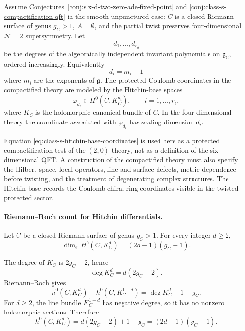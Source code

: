 Assume Conjectures~\ref{conj:six-d-two-zero-ade-fixed-point} and
\ref{conj:class-s-compactification-qft} in the smooth unpunctured case:
\(C\) is a closed Riemann surface of genus \(g_C>1\), \(A=\emptyset\), and
the partial twist preserves four-dimensional \(\mathcal N=2\) supersymmetry.
Let
\[
  d_1,\ldots,d_{r_{\mathfrak g}}
\]
be the degrees of the algebraically independent invariant polynomials on
\(\mathfrak g_{\mathbb C}\), ordered increasingly.  Equivalently
\[
  d_i=m_i+1
\]
where \(m_i\) are the exponents of \(\mathfrak g\).  The protected Coulomb
coordinates in the compactified theory are modeled by the Hitchin-base
spaces
\begin{equation}
  \varphi_{d_i}\in H^0(C,K_C^{d_i}),
  \qquad i=1,\ldots,r_{\mathfrak g},
  \label{eq:class-s-hitchin-base-coordinates}
\end{equation}
where \(K_C\) is the holomorphic canonical bundle of \(C\).  In the
four-dimensional theory the coordinate associated with \(\varphi_{d_i}\) has
scaling dimension \(d_i\).

\begin{remark}
\label{rem:hitchin-base-status-six-d}
Equation \eqref{eq:class-s-hitchin-base-coordinates} is used here as a
protected compactification test of the \((2,0)\) theory, not as a definition
of the six-dimensional QFT.  A construction of the compactified theory must
also specify the Hilbert space, local operators, line and surface defects,
metric dependence before twisting, and the treatment of degenerating complex
structures.  The Hitchin base records the Coulomb chiral ring coordinates
visible in the twisted protected sector.
\end{remark}

\paragraph{Riemann--Roch count for Hitchin differentials.}
Let \(C\) be a closed Riemann surface of genus \(g_C>1\).  For every integer
\(d\ge2\),
\begin{equation}
  \dim_{\mathbb C}H^0(C,K_C^d)=(2d-1)(g_C-1).
  \label{eq:hitchin-differential-dimension}
\end{equation}

The degree of \(K_C\) is \(2g_C-2\), hence
\[
  \deg K_C^d=d(2g_C-2).
\]
Riemann--Roch gives
\begin{equation}
  h^0(C,K_C^d)-h^0(C,K_C^{1-d})
  =
  \deg K_C^d+1-g_C .
  \label{eq:rr-hitchin-differential}
\end{equation}
For \(d\ge2\), the line bundle \(K_C^{1-d}\) has negative degree, so it has
no nonzero holomorphic sections.  Therefore
\[
  h^0(C,K_C^d)
  =
  d(2g_C-2)+1-g_C
  =
  (2d-1)(g_C-1).
\]

